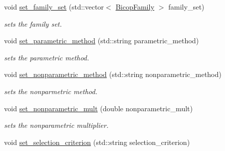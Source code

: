 \begin{DoxyCompactItemize}
void \hyperlink{classvinecopulib_1_1_fit_controls_bicop_a39d4e24261da184abf3fa3dd11d1f23b}{set\+\_\+family\+\_\+set} (std\+::vector$<$ \hyperlink{namespacevinecopulib_a42e95cc06d33896199caab0c11ad44f3}{Bicop\+Family} $>$ family\+\_\+set)
\begin{DoxyCompactList}\small\item\em sets the family set. \end{DoxyCompactList}\item 
\mbox{\label{classvinecopulib_1_1_fit_controls_bicop_a722bef09427577ba2f04c91d7e4dba90}} 
void \hyperlink{classvinecopulib_1_1_fit_controls_bicop_a722bef09427577ba2f04c91d7e4dba90}{set\+\_\+parametric\+\_\+method} (std\+::string parametric\+\_\+method)
\begin{DoxyCompactList}\small\item\em sets the parametric method. \end{DoxyCompactList}\item 
\mbox{\label{classvinecopulib_1_1_fit_controls_bicop_a5b785f0e3384d224025e754d2f212881}} 
void \hyperlink{classvinecopulib_1_1_fit_controls_bicop_a5b785f0e3384d224025e754d2f212881}{set\+\_\+nonparametric\+\_\+method} (std\+::string nonparametric\+\_\+method)
\begin{DoxyCompactList}\small\item\em sets the nonparmetric method. \end{DoxyCompactList}\item 
\mbox{\label{classvinecopulib_1_1_fit_controls_bicop_a69fa1ff241282cc5a968ff64f0029ae0}} 
void \hyperlink{classvinecopulib_1_1_fit_controls_bicop_a69fa1ff241282cc5a968ff64f0029ae0}{set\+\_\+nonparametric\+\_\+mult} (double nonparametric\+\_\+mult)
\begin{DoxyCompactList}\small\item\em sets the nonparametric multiplier. \end{DoxyCompactList}\item 
\mbox{\label{classvinecopulib_1_1_fit_controls_bicop_a52c187e5fcf047825ced777d73483df1}} 
void \hyperlink{classvinecopulib_1_1_fit_controls_bicop_a52c187e5fcf047825ced777d73483df1}{set\+\_\+selection\+\_\+criterion} (std\+::string selection\+\_\+criterion)

\end{DoxyCompactItemize}
